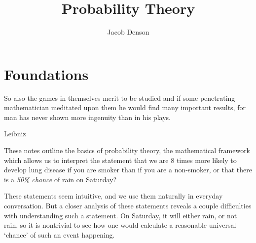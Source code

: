 

\title{Probability Theory}
\author{Jacob Denson}



\maketitle
\tableofcontents
{}

\setlength{}

\chapter{Foundations}


\epigraph{So also the games in themselves merit to be studied and if some penetrating mathematician meditated upon them he would find many important results, for man has never shown more ingenuity than in his plays.}{Leibniz}

These notes outline the basics of probability theory, the mathematical framework which allows us to interpret the statement that we are 8 times more likely to develop lung disease if you are smoker than if you are a non-smoker, or that there is a \emph{50\% chance} of rain on Saturday?

These statements seem intuitive, and we use them naturally in everyday conversation. But a closer analysis of these statements reveals a couple difficulties with understanding such a statement. On Saturday, it will either rain, or not rain, so it is nontrivial to see how one would calculate a reasonable universal `chance' of such an event happening.

